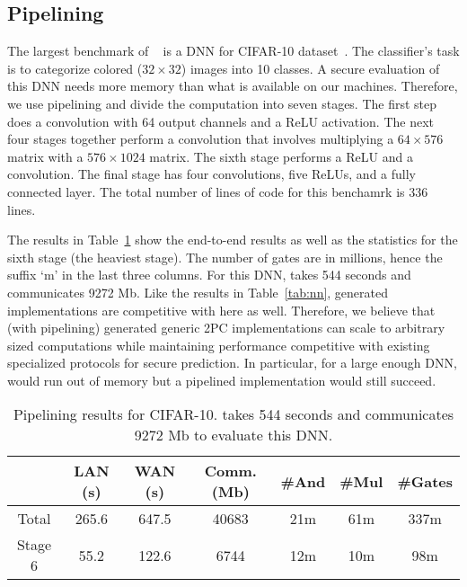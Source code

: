 \subsection{Pipelining}
\label{sec:pipeeval}
The largest benchmark of \minion~\cite{minionn} is a DNN for CIFAR-10 dataset~\cite{cifar}.
The classifier's task is to categorize colored ($32\times 32$) images into 10 classes. A secure evaluation of this DNN needs more memory than what is available
on our machines. Therefore, we use pipelining and divide the computation into seven stages.
The first step does a convolution with 64 output channels and a ReLU activation.
The next four stages together perform a convolution that involves multiplying a $64\times 576$ matrix with a
$576\times 1024$ matrix. The sixth stage performs a ReLU and a convolution.
The final stage has four convolutions, five ReLUs, and a fully connected layer.
The total number of lines of \tool code for this benchamrk is 336 lines.


The results in Table~\ref{tab:cifar} show the end-to-end results as well as the statistics for the sixth stage (the heaviest stage). 
The number of gates are in millions, hence the suffix `m' in the last three columns.
For this DNN, \minion takes 544 seconds and communicates 9272 Mb. 
Like the results in Table~\ref{tab:nn}, \tool generated implementations are competitive with \minion here as well. Therefore, we believe that (with pipelining) \tool generated generic 2PC implementations can scale to arbitrary sized computations  while maintaining performance
competitive with existing specialized protocols for secure prediction.
In particular, for a large enough DNN, \minion would run out of memory
but a pipelined \tool implementation would still succeed.
\begin{table}
\begin{tabular}{c|c|c|c |c|c|c}
           &  LAN (s) & WAN (s) & Comm. (Mb)  & \#And & \#Mul & \#Gates \\
\hline
Total      &  265.6       & 647.5        & 40683       & 21m    & 61m    &  337m  \\
\hline
Stage 6    &  55.2        & 122.6        & 6744        & 12m    & 10m   &  98m  \\
\hline
\end{tabular}

 \caption{Pipelining results for CIFAR-10. \minion takes 544 seconds and communicates 9272 Mb to evaluate this DNN.}
 \label{tab:cifar} 
\end{table}

